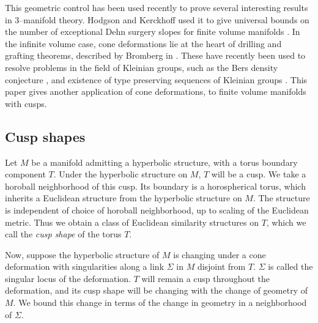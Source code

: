 This geometric control has been used recently to prove several
interesting results in 3--manifold theory.  Hodgson and Kerckhoff used
it to give universal bounds on the number of exceptional Dehn surgery
slopes for finite volume manifolds \cite{hk:univ}.  In the infinite
volume case, cone deformations lie at the heart of drilling and
grafting theorems, described by Bromberg in \cite{bromberg:cone}.
These have recently been used to resolve problems in the field of
Kleinian groups, such as the Bers density conjecture
\cite{brock-bromberg:density}, and existence of type preserving
sequences of Kleinian groups \cite{brock-bromberg-evans-souto:tame}.
This paper gives another application of cone deformations, to finite
volume manifolds with cusps.

\subsection{Cusp shapes}

Let $M$ be a manifold admitting a hyperbolic structure, with a torus
boundary component $T$. Under the hyperbolic structure on $M$, $T$
will be a cusp.  We take a horoball neighborhood of this cusp.  Its
boundary is a horospherical torus, which inherits a Euclidean
structure from the hyperbolic structure on $M$.  The structure is
independent of choice of horoball neighborhood, up to scaling of the
Euclidean metric.  Thus we obtain a class of Euclidean similarity
structures on $T$, which we call the \emph{cusp shape} of the torus
$T$.

Now, suppose the hyperbolic structure of $M$ is changing under a cone
deformation with singularities along a link $\Sigma$ in $M$ disjoint
from $T$.  $\Sigma$ is called the singular locus of the deformation.
$T$ will remain a cusp throughout the deformation, and its cusp shape
will be changing with the change of geometry of $M$.  We bound this
change in terms of the change in geometry in a neighborhood of
$\Sigma$.

